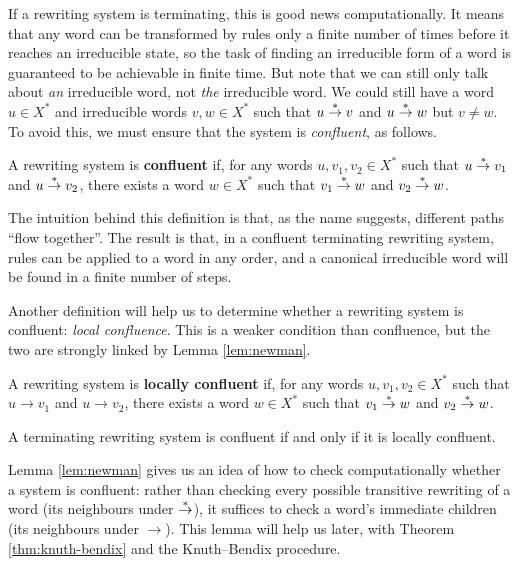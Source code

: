 If a rewriting system is terminating, this is good news computationally.  It
means that any word can be transformed by rules only a finite number of times
before it reaches an irreducible state, so the task of finding an irreducible
form of a word is guaranteed to be achievable in finite time.  But note that we
can still only talk about \textit{an} irreducible word, not \textit{the}
irreducible word.  We could still have a word $u \in X^*$ and irreducible words
$v, w \in X^*$ such that $u \stackrel{*}{\to} v$ and $u \stackrel{*}{\to} w$ but $v \neq w$.
To avoid this, we must ensure that the system is \textit{confluent}, as follows.

\begin{definition}
  A rewriting system is \textbf{confluent} if, for any words $u,v_1,v_2 \in X^*$
  such that $u \stackrel{*}{\to} v_1$ and $u \stackrel{*}{\to} v_2$, there exists a word $w \in X^*$
  such that $v_1 \stackrel{*}{\to} w$ and $v_2 \stackrel{*}{\to} w$.
\end{definition}

The intuition behind this definition is that, as the name suggests, different
paths ``flow together''.  The result is that, in a confluent terminating
rewriting system, rules can be applied to a word in any order, and a canonical
irreducible word will be found in a finite number of steps.

Another definition will help us to determine whether a rewriting system is
confluent: \textit{local confluence}.  This is a weaker condition than
confluence, but the two are strongly linked by Lemma \ref{lem:newman}.


\begin{definition}
  A rewriting system is \textbf{locally confluent} if, for any words
  $u,v_1,v_2 \in X^*$ such that $u \to v_1$ and $u \to v_2$, there exists a word
  $w \in X^*$ such that $v_1 \stackrel{*}{\to} w$ and $v_2 \stackrel{*}{\to} w$.
\end{definition}

\begin{lemma} %
  \label{lem:newman}
  A terminating rewriting system is confluent if and only if it is locally
  confluent.
\end{lemma}

Lemma \ref{lem:newman} gives us an idea of how to check computationally whether
a system is confluent: rather than checking every possible transitive rewriting
of a word (its neighbours under $\stackrel{*}{\to}$), it suffices to check a word's
immediate children (its neighbours under $\to$).  This lemma will help us later,
with Theorem \ref{thm:knuth-bendix} and the Knuth--Bendix procedure.

